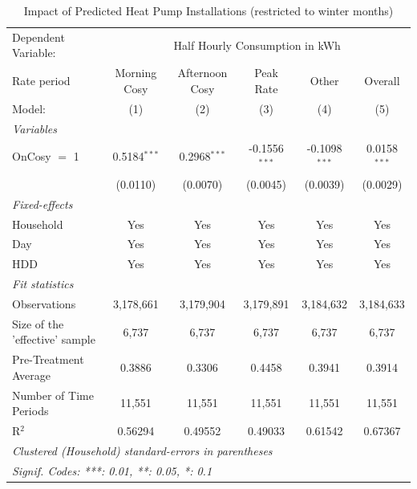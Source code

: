 
\begin{table}[htbp]
   \caption{\label{tab:hp-impact} Impact of Predicted Heat Pump Installations (restricted to winter months)}
   \centering
   \begin{tabular}{lccccc}
      \tabularnewline \midrule \midrule
      Dependent Variable: & \multicolumn{5}{c}{Half Hourly Consumption in kWh}\\
      Rate period                    & Morning Cosy   & Afternoon Cosy & Peak Rate       & Other           & Overall \\   
      Model:                         & (1)            & (2)            & (3)             & (4)             & (5)\\  
      \midrule
      \emph{Variables}\\
      OnCosy $=$ 1                   & 0.5184$^{***}$ & 0.2968$^{***}$ & -0.1556$^{***}$ & -0.1098$^{***}$ & 0.0158$^{***}$\\   
                                     & (0.0110)       & (0.0070)       & (0.0045)        & (0.0039)        & (0.0029)\\   
      \midrule
      \emph{Fixed-effects}\\
      Household                      & Yes            & Yes            & Yes             & Yes             & Yes\\  
      Day                            & Yes            & Yes            & Yes             & Yes             & Yes\\  
      HDD                            & Yes            & Yes            & Yes             & Yes             & Yes\\  
      \midrule
      \emph{Fit statistics}\\
      Observations                   & 3,178,661      & 3,179,904      & 3,179,891       & 3,184,632       & 3,184,633\\  
      Size of the 'effective' sample & 6,737          & 6,737          & 6,737           & 6,737           & 6,737\\  
      Pre-Treatment Average          & 0.3886         & 0.3306         & 0.4458          & 0.3941          & 0.3914\\  
      Number of Time Periods         & 11,551         & 11,551         & 11,551          & 11,551          & 11,551\\  
      R$^2$                          & 0.56294        & 0.49552        & 0.49033         & 0.61542         & 0.67367\\  
      \midrule \midrule
      \multicolumn{6}{l}{\emph{Clustered (Household) standard-errors in parentheses}}\\
      \multicolumn{6}{l}{\emph{Signif. Codes: ***: 0.01, **: 0.05, *: 0.1}}\\
   \end{tabular}
\end{table}


